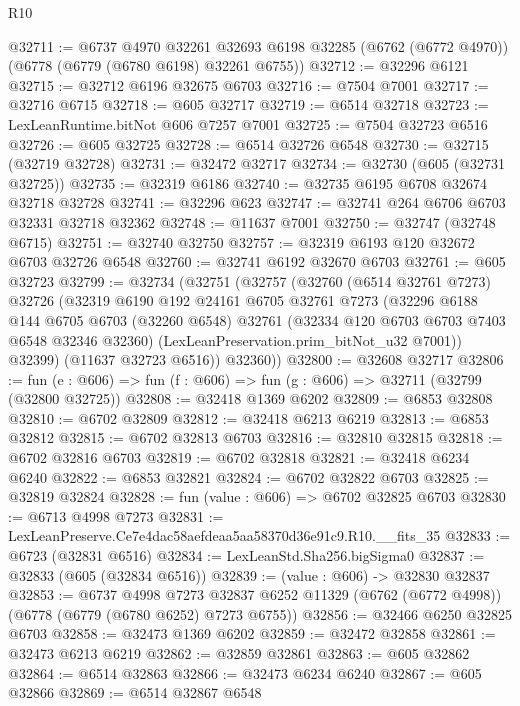 \begin{lexlean}{R10}
\begin{coremodule}
@32711 := @6737
    @4970
    @32261
    @32693
    @6198
    @32285
    (@6762 (@6772 @4970))
    (@6778 (@6779 (@6780 @6198) @32261 @6755))
@32712 := @32296 @6121
@32715 := @32712 @6196 @32675 @6703
@32716 := @7504 @7001
@32717 := @32716 @6715
@32718 := @605 @32717
@32719 := @6514 @32718
@32723 := LexLeanRuntime.bitNot @606 @7257 @7001
@32725 := @7504 @32723 @6516
@32726 := @605 @32725
@32728 := @6514 @32726 @6548
@32730 := @32715 (@32719 @32728)
@32731 := @32472 @32717
@32734 := @32730 (@605 (@32731 @32725))
@32735 := @32319 @6186
@32740 := @32735 @6195 @6708 @32674 @32718 @32728
@32741 := @32296 @623
@32747 := @32741 @264 @6706 @6703 @32331 @32718 @32362
@32748 := @11637 @7001
@32750 := @32747 (@32748 @6715)
@32751 := @32740 @32750
@32757 := @32319 @6193 @120 @32672 @6703 @32726 @6548
@32760 := @32741 @6192 @32670 @6703
@32761 := @605 @32723
@32799 := @32734
    (@32751
      (@32757
        (@32760
          (@6514 @32761 @7273)
          @32726
          (@32319
            @6190
            @192
            @24161
            @6705
            @32761
            @7273
            (@32296
              @6188
              @144
              @6705
              @6703
              (@32260 @6548)
              @32761
              (@32334 @120 @6703 @6703 @7403 @6548 @32346 @32360)
              (LexLeanPreservation.prim_bitNot_u32 @7001))
            @32399)
          (@11637 @32723 @6516))
        @32360))
@32800 := @32608 @32717
@32806 := fun (e : @606) => fun (f : @606) => fun (g : @606) => @32711 (@32799 (@32800 @32725))
@32808 := @32418 @1369 @6202
@32809 := @6853 @32808
@32810 := @6702 @32809
@32812 := @32418 @6213 @6219
@32813 := @6853 @32812
@32815 := @6702 @32813 @6703
@32816 := @32810 @32815
@32818 := @6702 @32816 @6703
@32819 := @6702 @32818
@32821 := @32418 @6234 @6240
@32822 := @6853 @32821
@32824 := @6702 @32822 @6703
@32825 := @32819 @32824
@32828 := fun (value : @606) => @6702 @32825 @6703
@32830 := @6713 @4998 @7273
@32831 := LexLeanPreserve.Ce7e4dac58aefdeaa5aa58370d36e91c9.R10.__fits_35
@32833 := @6723 (@32831 @6516)
@32834 := LexLeanStd.Sha256.bigSigma0
@32837 := @32833 (@605 (@32834 @6516))
@32839 := (value : @606) -> @32830 @32837
@32853 := @6737
    @4998
    @7273
    @32837
    @6252
    @11329
    (@6762 (@6772 @4998))
    (@6778 (@6779 (@6780 @6252) @7273 @6755))
@32856 := @32466 @6250 @32825 @6703
@32858 := @32473 @1369 @6202
@32859 := @32472 @32858
@32861 := @32473 @6213 @6219
@32862 := @32859 @32861
@32863 := @605 @32862
@32864 := @6514 @32863
@32866 := @32473 @6234 @6240
@32867 := @605 @32866
@32869 := @6514 @32867 @6548

\end{coremodule}
\end{lexlean}
